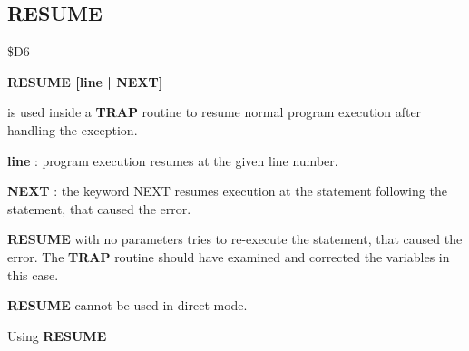 \subsection{RESUME}
\begin{description}[leftmargin=3cm,style=nextline]
\item [Token:] \$D6
\item [Format:] {\bf RESUME [line | NEXT]}
\item [Usage:]  is used inside a {\bf TRAP} routine to
                resume normal program execution after
                handling the exception.

                {\bf line} : program execution resumes
                at the given line number.

                {\bf NEXT} : the keyword NEXT resumes
                execution at the statement following
                the statement, that caused the error.

                {\bf RESUME} with no parameters tries to
                re-execute the statement, that caused the error.
                The {\bf TRAP} routine should have examined
                and corrected the variables in this case.

\item [Remarks:] {\bf RESUME} cannot be used in direct mode.
\item [Example:] Using {\bf RESUME}

\end{description}


\newpage
